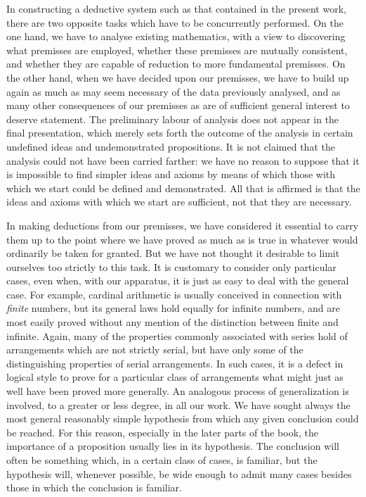 \documentclass[letterpaper,12pt,openany,leqno]{book}
\begin{document}
In constructing a deductive system such as that contained in the present work, there are two opposite tasks which have to be concurrently performed. On the one hand, we have to analyse existing mathematics, with a view to discovering what premisses are employed, whether these premisses are mutually consistent, and whether they are capable of reduction to more fundamental premisses. On the other hand, when we have decided upon our premisses, we have to build up again as much as may seem necessary of the data previously analysed, and as many other consequences of our premisses as are of sufficient general interest to deserve statement. The preliminary labour of analysis does not appear in the final presentation, which merely sets forth the outcome of the analysis in certain undefined ideas and undemonstrated propositions. It is not claimed that the analysis could not have been carried farther: we have no reason to suppose that it is impossible to find simpler ideas and axioms by means of which those with which we start could be defined and demonstrated. All that is affirmed is that the ideas and axioms with which we start are sufficient, not that they are necessary.

In making deductions from our premisses, we have considered it essential to carry them up to the point where we have proved as much as is true in whatever would ordinarily be taken for granted. But we have not thought it desirable to limit ourselves too strictly to this task. It is customary to consider only particular cases, even when, with our apparatus, it is just as easy to deal with the general case. For example, cardinal arithmetic is usually conceived in connection with \textit{finite} numbers, but its general laws hold equally for infinite numbers, and are most easily proved without any mention of the distinction between finite and infinite. Again, many of the properties commonly associated with series hold of arrangements which are not strictly serial, but have only some of the distinguishing properties of serial arrangements. In such cases, it is a defect in logical style to prove for a particular class of arrangements what might just as well have been proved more generally. An analogous process of generalization is involved, to a greater or less degree, in all our work. We have sought always the most general reasonably simple hypothesis from which any given conclusion could be reached. For this reason, especially in the later parts of the book, the importance of a proposition usually lies in its hypothesis. The conclusion will often be something which, in a certain class of cases, is familiar, but the hypothesis will, whenever possible, be wide enough to admit many cases besides those in which the conclusion is familiar.
\end{document}
